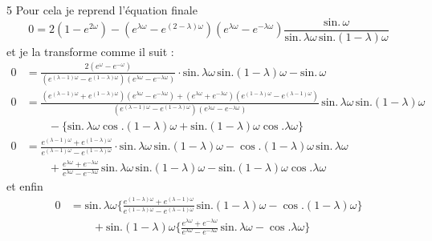 \documentclass[11pt,a4paper]{article}
\begin{document}
5 Pour cela je reprend l'équation finale
\[ 0=2(1-e^{2\omega})-(e^{\lambda\omega}-e^{(2-\lambda)\omega})(e^{\lambda\omega}-e^{-\lambda\omega})\frac{\text{sin.}\,\omega}{\text{sin.}\,\lambda\omega\,\text{sin.}(1-\lambda)\omega} \]
et je la transforme comme il suit :
\begin{align*}
0&=\frac{2(e^{\omega}-e^{-\omega})}{(e^{(\lambda-1)\omega}-e^{(1-\lambda)\omega})(e^{\lambda\omega}-e^{-\lambda\omega})}\cdot \text{sin.}\,\lambda\omega\,\text{sin.}(1-\lambda)\omega-\text{sin.}\,\omega \\
0&=\frac{(e^{(\lambda-1)\omega}+e^{(1-\lambda)\omega})(e^{\lambda\omega}-e^{-\lambda\omega})+(e^{\lambda\omega}+e^{-\lambda\omega})(e^{(1-\lambda)\omega}-e^{(\lambda-1)\omega})}{(e^{(\lambda-1)\omega}-e^{(1-\lambda)\omega})(e^{\lambda\omega}-e^{-\lambda\omega})}\,\text{sin.}\,\lambda\omega\,\text{sin.}(1-\lambda)\omega \\
&\qquad -\big\{\text{sin.}\,\lambda\omega\cos.(1-\lambda)\omega+\text{sin.}(1-\lambda)\omega\cos.\lambda\omega\big\} \\
0&=\frac{e^{(\lambda-1)\omega}+e^{(1-\lambda)\omega}}{e^{(\lambda-1)\omega}-e^{(1-\lambda)\omega}}\cdot\text{sin.}\,\lambda\omega\,\text{sin.}(1-\lambda)\omega-\cos.(1-\lambda)\omega\,\text{sin.}\,\lambda\omega \\
&\qquad +\frac{e^{\lambda\omega}+e^{-\lambda\omega}}{e^{\lambda\omega}-e^{-\lambda\omega}}\,\text{sin.}\,\lambda\omega\,\text{sin.}(1-\lambda)\omega-\text{sin.}(1-\lambda)\omega\cos.\lambda\omega
\end{align*}
et enfin
\begin{align*}
0&=\text{sin.}\,\lambda\omega\Big\{\frac{e^{(1-\lambda)\omega}+e^{(\lambda-1)\omega}}{e^{(1-\lambda)\omega}-e^{(\lambda-1)\omega}}\,\text{sin.}(1-\lambda)\omega-\cos.(1-\lambda)\omega\Big\} \\
&\qquad +\text{sin.}(1-\lambda)\omega\Big\{\frac{e^{\lambda\omega}+e^{-\lambda\omega}}{e^{\lambda\omega}-e^{-\lambda\omega}}\,\text{sin.}\,\lambda\omega-\cos.\lambda\omega\Big\}
\end{align*}
\end{document}

